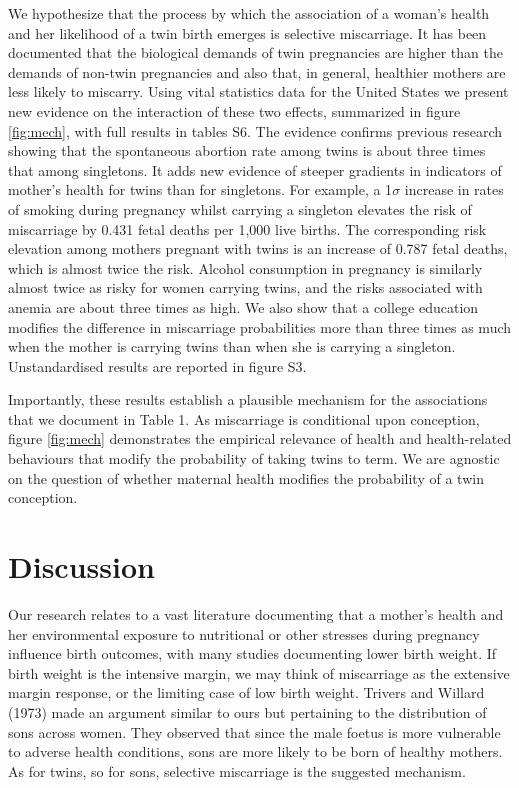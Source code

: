 \documentclass[11pt]{article}
\begin{document}
We hypothesize that the process by which the association of a woman's health and her likelihood of a twin birth emerges is selective miscarriage. It has been documented that the biological demands of twin pregnancies are higher than the demands of non-twin pregnancies\cite{Shinagawaetal2005,Kahnetal2003} and also that, in general, healthier mothers are less likely to miscarry\cite{Garciaetal2002}. Using vital statistics data for the United States we present new evidence on the interaction of these two effects, summarized in figure \ref{fig:mech}, with full results in tables S6. The evidence confirms previous research showing that the spontaneous abortion rate among twins is about three times that among singletons\cite{Boklage1990}. It adds new evidence of steeper gradients in indicators of mother's health for twins than for singletons. For example, a 1$\sigma$ increase in rates of smoking during pregnancy whilst carrying a singleton elevates the risk of miscarriage by 0.431 fetal deaths per 1,000 live births. The corresponding risk elevation among mothers pregnant with twins is an increase of 0.787 fetal deaths, which is almost twice the risk. Alcohol consumption in pregnancy is similarly almost twice as risky for women carrying twins, and the risks associated with anemia are about three times as high. We also show that a college education modifies the difference in miscarriage probabilities more than three times as much when the mother is carrying twins than when she is carrying a singleton.  Unstandardised results are reported in figure S3.


Importantly, these results establish a plausible mechanism for the associations that we document in Table 1. As miscarriage is conditional upon conception, figure \ref{fig:mech} demonstrates the empirical relevance of health and health-related behaviours that modify the probability of taking twins to term. We are agnostic on the question of whether maternal health modifies the probability of a twin conception.

\section*{Discussion}
Our research relates to a vast literature documenting that a mother's health and her environmental exposure to nutritional or other stresses during pregnancy influence birth outcomes, with many studies documenting lower birth weight\cite{CurrieMoretti2007,Bernsteinetal2005,SerranoDomeque2014}. If birth weight is the intensive margin, we may think of miscarriage as the extensive margin response, or the limiting case of low birth weight. Trivers and Willard (1973) made an argument similar to ours but pertaining to the distribution of sons across women\cite{TriversWillard1973}. They observed that since the male foetus is more vulnerable to adverse health conditions, sons are more likely to be born of healthy mothers. As for twins, so for sons, selective miscarriage is the suggested mechanism.
\end{document}
